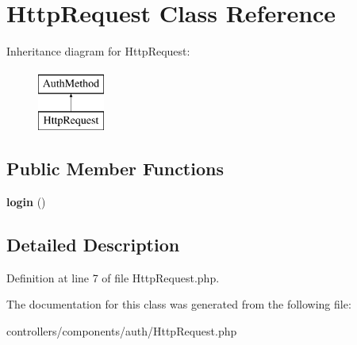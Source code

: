 \hypertarget{class_http_request}{
\section{HttpRequest Class Reference}
\label{class_http_request}
}
Inheritance diagram for HttpRequest:\begin{figure}[H]
\begin{center}
\leavevmode
\includegraphics[height=2.000000cm]{class_http_request}
\end{center}
\end{figure}
\subsection*{Public Member Functions}
\begin{DoxyCompactItemize}
\item 
\hypertarget{class_http_request_a4e027af9db31f49abf28c7f26c386211}{
{\bfseries login} ()}
\label{class_http_request_a4e027af9db31f49abf28c7f26c386211}

\end{DoxyCompactItemize}


\subsection{Detailed Description}


Definition at line 7 of file HttpRequest.php.



The documentation for this class was generated from the following file:\begin{DoxyCompactItemize}
\item 
controllers/components/auth/HttpRequest.php\end{DoxyCompactItemize}

